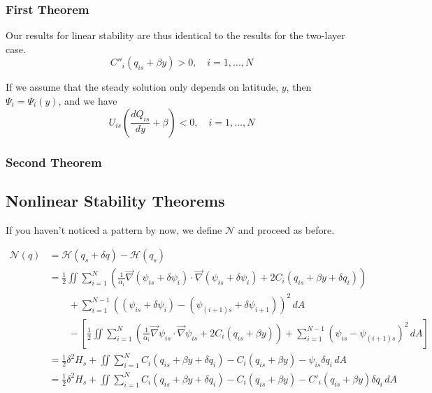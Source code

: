 \documentclass[12pt]{article}
\begin{document}
{{        \subsubsection{First Theorem}{
            Our results for linear stability are thus identical to the results for the two-layer case.
            $$
            C''_i(q_{is} + \beta y) > 0, \quad i=1,...,N
            $$

            If we assume that the steady solution only depends on latitude, $y$, then $\Psi_i = \Psi_i(y)$, and we have
            $$
            U_{is} \left(\frac{d Q_{is}}{dy} + \beta \right) < 0, \quad i=1,...,N
            $$
        }
        \subsubsection{Second Theorem}{        
        }
    }

    \subsection{Nonlinear Stability Theorems}{
        If you haven't noticed a pattern by now, we define $\mathcal{N}$ and proceed as before.

        \begin{align*}
            \mathcal{N}(q)
            & = \mathcal{H}(q_s + \delta q) - \mathcal{H}(q_s) \\
            &= \frac12 \iint \sum_{i=1}^N \left( \frac{1}{\alpha_i}\vec\nabla (\psi_{is} + \delta\psi_i) \cdot \vec\nabla (\psi_{is} + \delta\psi_i) + 2C_i(q_{is} + \beta y + \delta q_i) \right) \\
            &\quad\quad + \sum_{i=1}^{N-1}((\psi_{is} + \delta\psi_i) - (\psi_{(i+1)s} + \delta\psi_{i+1}))^2 \, dA \\
            &\quad\quad - \left[ \frac12 \iint \sum_{i=1}^N \left( \frac{1}{\alpha_i}\vec\nabla \psi_{is} \cdot \vec\nabla \psi_{is} + 2C_i(q_{is} + \beta y) \right) + \sum_{i=1}^{N-1}(\psi_{is} - \psi_{(i+1)s})^2 \, dA \right] \\
            &= \frac12 \delta^2 H_s + \iint \sum_{i=1}^N C_i(q_{is} + \beta y + \delta q_i) - C_i(q_{is} + \beta y) - \psi_{is}\delta q_i \, dA \\
            &= \frac12 \delta^2 H_s + \iint \sum_{i=1}^N C_i(q_{is} + \beta y + \delta q_i) - C_i(q_{is} + \beta y) - C'_i(q_{is} + \beta y)\delta q_i \, dA \\
        \end{align*}
    }
}
\end{document}
